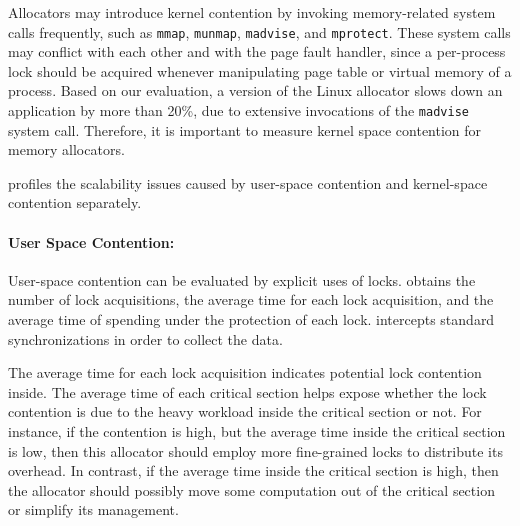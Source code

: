 
 
 Allocators may introduce kernel contention by invoking memory-related system calls frequently, such as \texttt{mmap}, \texttt{munmap}, \texttt{madvise}, and \texttt{mprotect}. These system calls may conflict with each other and with the page fault handler, since a per-process lock should be acquired whenever manipulating  page table or virtual memory of a process. Based on our evaluation, a version of the Linux allocator slows down an application by more than 20\%, due to extensive invocations of the \texttt{madvise} system call. Therefore, it is important to measure  kernel space contention for memory allocators.
 
 \label{sec:scaleidea}

\MP{} profiles the scalability issues caused by user-space contention and kernel-space contention separately. 

\paragraph{User Space Contention:} User-space contention can be evaluated by explicit uses of locks. \MP{} obtains the number of lock acquisitions, the average time for each lock acquisition, and the average time of spending under the protection of each lock. \MP{} intercepts standard synchronizations in order to collect the data. 

The average time for each lock acquisition indicates potential lock contention inside. The average time of each critical section helps expose whether the lock contention is due to the heavy workload inside the critical section or not. For instance, if the contention is high, but the average time inside the critical section is low, then this allocator should employ more fine-grained locks to distribute its overhead. In contrast, if the average time inside the critical section is high, then the allocator should possibly move some computation out of the critical section or simplify its management. 

